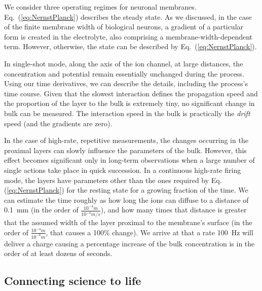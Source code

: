 We consider three operating regimes for neuronal membranes. Eq.~(\ref{eq:NernstPlanck})
describes the steady state. As we discussed, in the case of the finite
membrane width of biological neurons, a gradient of a particular form
is created in the electrolyte, also comprising a membrane-width-dependent
term. However, otherwise, the state can be described by Eq.~(\ref{eq:NernstPlanck}). 

In single-shot mode, along the axis of the ion channel, at large distances,
the concentration and potential remain essentially unchanged during
the process. Using our time derivatives, we can describe the details,
including the process's time course. Given that the slowest interaction
defines the propagation speed and the proportion of the layer to the
bulk is extremely tiny, no significant change in bulk can be measured.
The interaction speed in the bulk is practically the \emph{drift}
speed (and the gradients are zero).

In the case of high-rate, repetitive measurements, the changes occurring
in the proximal layers can slowly influence the parameters of the
bulk. However, this effect becomes significant only in long-term observations
when a large number of single actions take place in quick succession.
In a continuous high-rate firing mode, the layers have parameters
other than the ones required by Eq.(\ref{eq:NernstPlanck}) for the resting
state for a growing fraction of the time. We can estimate the time
roughly as how long the ions can diffuse to a distance of 0.1\ mm
(in the order of $\frac{10^{-4}m}{10^{-4}m/s}$), and how many times
that distance is greater that the assumed width of the layer proximal
to the membrane's surface (in the order of $\frac{10^{-4}m}{10^{-8}m}$,
that causes a 100\% change). We arrive at that a rate 100\ Hz will
deliver a charge causing a percentage increase of the bulk concentration
is in the order of at least dozens of seconds. 

\subsection{Connecting science to life\label{sec:Physiology-Life}}


